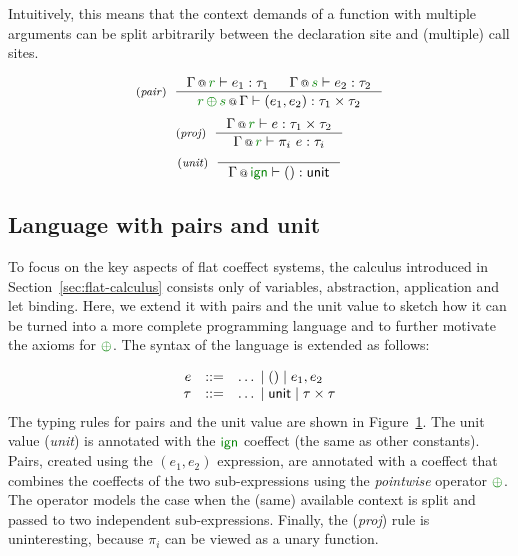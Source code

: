 \noindent
Intuitively, this means that the context demands of a function with multiple arguments can be
split arbitrarily between the declaration site and (multiple) call sites.


\begin{figure}[t]
\begin{equation*}
\tyrule{pair}
  {\coctx{\Gamma}{\cclrd{r}} \vdash e_1 : \tau_1 & \coctx{\Gamma}{\cclrd{s}} \vdash e_2 : \tau_2}
  {\coctx{\cclrd{r}\,\cpar\,\cclrd{s}}{\Gamma} \vdash (e_1, e_2) : \tau_1 \times \tau_2 }
\end{equation*}
\begin{equation*}
\tyrule{proj}
  {\coctx{\Gamma}{\cclrd{r}} \vdash e : \tau_1 \times \tau_2 }
  {\coctx{\Gamma}{\cclrd{r}} \vdash \pi_i~e : \tau_{i} }
\end{equation*}
\begin{equation*}
\tyrule{unit}
  {}
  {\coctx{\Gamma}{\czero} \vdash () : \ident{unit} }
\end{equation*}

\label{fig:flat-ext-types}
\end{figure}


\subsection{Language with pairs and unit}
\label{sec:flat-exts-tup}

To focus on the key aspects of flat coeffect systems, the calculus introduced in Section~\ref{sec:flat-calculus}
consists only of variables, abstraction, application and let binding. Here, we extend it with pairs
and the unit value to sketch how it can be turned into a more complete programming language and to
further motivate the axioms for $\cpar$. The syntax of the language is extended as follows:

\noindent
\begin{equation*}
\begin{array}{rcl}
e &::=& \ldots \sep () \sep e_1, e_2 \\
\tau &::=& \ldots \sep \ident{unit} \sep \tau \times \tau
\end{array}
\end{equation*}
%
The typing rules for pairs and the unit value are shown in Figure~\ref{fig:flat-ext-types}.
The unit value (\emph{unit}) is annotated with the $\czero$ coeffect (the same as other constants).
Pairs, created using the $(e_1, e_2)$ expression, are annotated with a coeffect that combines
the coeffects of the two sub-expressions using the \emph{pointwise} operator $\cpar$. The operator
models the case when the (same) available context is split and passed to two independent
sub-expressions. Finally, the (\emph{proj}) rule is uninteresting, because $\pi_i$ can be
viewed as a unary function.

